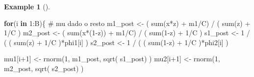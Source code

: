 \documentclass[
  letterpaper,
  DIV=11,
  numbers=noendperiod]{scrreprt}
\newenvironment{Shaded}{\begin{snugshade}}{\end{snugshade}}
\newcommand{\CommentTok}[1]{\textcolor[rgb]{0.37,0.37,0.37}{#1}}
\newcommand{\ControlFlowTok}[1]{\textcolor[rgb]{0.00,0.23,0.31}{\textbf{#1}}}
\newcommand{\DecValTok}[1]{\textcolor[rgb]{0.68,0.00,0.00}{#1}}
\newcommand{\FunctionTok}[1]{\textcolor[rgb]{0.28,0.35,0.67}{#1}}
\newcommand{\NormalTok}[1]{\textcolor[rgb]{0.00,0.23,0.31}{#1}}
\newcommand{\OtherTok}[1]{\textcolor[rgb]{0.00,0.23,0.31}{#1}}
\newcommand{\SpecialCharTok}[1]{\textcolor[rgb]{0.37,0.37,0.37}{#1}}
\theoremstyle{definition}
\theoremstyle{plain}
\theoremstyle{definition}
\newtheorem{example}{Example}[chapter]
\theoremstyle{remark}
\begin{document}
\begin{example}[]
\begin{Shaded}
\begin{Highlighting}[]
\ControlFlowTok{for}\NormalTok{(i }\ControlFlowTok{in} \DecValTok{1}\SpecialCharTok{:}\NormalTok{B)\{}
  \CommentTok{\# mu dado o resto}
\NormalTok{  m1\_post }\OtherTok{\textless{}{-}}\NormalTok{ ( }\FunctionTok{sum}\NormalTok{(x}\SpecialCharTok{*}\NormalTok{z) }\SpecialCharTok{+}\NormalTok{ m1}\SpecialCharTok{/}\NormalTok{C) }\SpecialCharTok{/}\NormalTok{ ( }\FunctionTok{sum}\NormalTok{(z) }\SpecialCharTok{+} \DecValTok{1}\SpecialCharTok{/}\NormalTok{C )}
\NormalTok{  m2\_post }\OtherTok{\textless{}{-}}\NormalTok{ ( }\FunctionTok{sum}\NormalTok{(x}\SpecialCharTok{*}\NormalTok{(}\DecValTok{1}\SpecialCharTok{{-}}\NormalTok{z)) }\SpecialCharTok{+}\NormalTok{ m1}\SpecialCharTok{/}\NormalTok{C) }\SpecialCharTok{/}\NormalTok{ ( }\FunctionTok{sum}\NormalTok{(}\DecValTok{1}\SpecialCharTok{{-}}\NormalTok{z) }\SpecialCharTok{+} \DecValTok{1}\SpecialCharTok{/}\NormalTok{C )}
\NormalTok{  s1\_post }\OtherTok{\textless{}{-}} \DecValTok{1} \SpecialCharTok{/}\NormalTok{ ( ( }\FunctionTok{sum}\NormalTok{(z) }\SpecialCharTok{+} \DecValTok{1}\SpecialCharTok{/}\NormalTok{C )}\SpecialCharTok{*}\NormalTok{phi1[i] )}
\NormalTok{  s2\_post }\OtherTok{\textless{}{-}} \DecValTok{1} \SpecialCharTok{/}\NormalTok{ ( ( }\FunctionTok{sum}\NormalTok{(}\DecValTok{1}\SpecialCharTok{{-}}\NormalTok{z) }\SpecialCharTok{+} \DecValTok{1}\SpecialCharTok{/}\NormalTok{C )}\SpecialCharTok{*}\NormalTok{phi2[i] )}
  
\NormalTok{  mu1[i}\SpecialCharTok{+}\DecValTok{1}\NormalTok{] }\OtherTok{\textless{}{-}} \FunctionTok{rnorm}\NormalTok{(}\DecValTok{1}\NormalTok{, m1\_post, }\FunctionTok{sqrt}\NormalTok{( s1\_post) )}
\NormalTok{  mu2[i}\SpecialCharTok{+}\DecValTok{1}\NormalTok{] }\OtherTok{\textless{}{-}} \FunctionTok{rnorm}\NormalTok{(}\DecValTok{1}\NormalTok{, m2\_post, }\FunctionTok{sqrt}\NormalTok{( s2\_post) )}
  

\end{Highlighting}
\end{Shaded}
\end{example}
\end{document}
